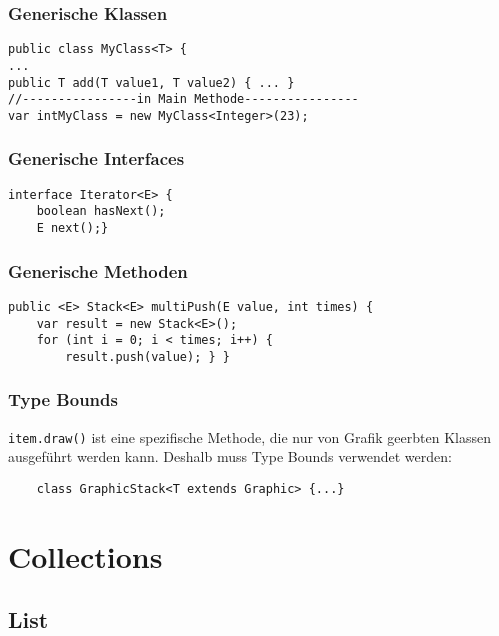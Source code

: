 \begin{multicols*}{5}
	\subsubsection{Generische Klassen}
	\begin{lstlisting}
public class MyClass<T> {
...
public T add(T value1, T value2) { ... }
//----------------in Main Methode----------------
var intMyClass = new MyClass<Integer>(23);
	\end{lstlisting}
	\subsubsection{Generische Interfaces}
		\begin{lstlisting}
interface Iterator<E> {
	boolean hasNext();
	E next();}
		\end{lstlisting}
	\subsubsection{Generische Methoden}
	\begin{lstlisting}
public <E> Stack<E> multiPush(E value, int times) { 
	var result = new Stack<E>();
	for (int i = 0; i < times; i++) { 
		result.push(value); } }
	\end{lstlisting}
	\subsubsection{Type Bounds}
	\tiny \texttt{item.draw()} \footnotesize ist eine spezifische Methode, die nur von Grafik geerbten Klassen ausgeführt werden kann. Deshalb muss Type Bounds verwendet werden:
	\begin{lstlisting}
	class GraphicStack<T extends Graphic> {...}
	\end{lstlisting}



	\columnbreak



	\section{Collections}
	\subsection{List}

\end{multicols*}
